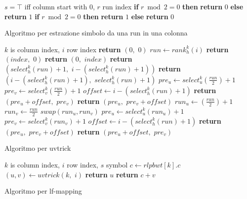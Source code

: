 \documentclass[a4paper,12pt, oneside]{book}
\begin{document}
\begin{algorithm}[H]
  \footnotesize
  \begin{algorithmic}[1]
    \Comment $s=\top$ iff column start with 0, $r$ run index
    \State \textbf{if} $r\bmod 2 = 0$ \textbf{then} \textbf{return} $0$
    \textbf{else} \textbf{return} $1$
    \Else
    \State \textbf{if} $r\bmod 2 = 0$ \textbf{then} \textbf{return} $1$
    \textbf{else} \textbf{return} $0$
    \EndIf
    \EndFunction
  \end{algorithmic}
  \caption{Algoritmo per estrazione simbolo da una run in una colonna}
\end{algorithm}

\begin{algorithm}[H]
  \footnotesize
  \begin{algorithmic}[1]
    \Comment $k$ is column index, $i$ row index
    \State \textbf{return} $(0,\,\,0)$
    \EndIf
    \State $run \gets rank_h^{k}(i)$
    \State \textbf{return} $(index,\,\, 0)$
    \Else
    \State \textbf{return} $(0, \,\,index)$
    \EndIf
    \State \textbf{return} $(select_h^{k}(run)+1,\,\, i-(select_h^{k}(run)+1))$
    \Else
    \State \textbf{return} $(i-(select_h^{k}(run)+1),\,\, select_h^{k}(run)+1)$
    \EndIf
    \Else
    \State $pre_u\gets select_u^{k}(\frac{run}{2})+1$
    \State $pre_v\gets select_v^{k}(\frac{run}{2})+1$
    \State $offset \gets i -(select_h^{k}(run)+1)$
    \State \textbf{return} $(pre_u+offset,\,\, pre_v)$
    \Else
    \State \textbf{return} $(pre_u, \,\,pre_v+offset)$
    \EndIf
    \Else
    \State $run_u\gets (\frac{run}{2})+1$
    \State $run_v\gets \frac{run}{2}$
    \State $swap(run_u, run_v)$
    \EndIf
    \State $pre_u\gets select_u^{k}(run_u)+1$
    \State $pre_v\gets select_v^{k}(run_v)+1$
    \State $offset \gets i -(select_h^{k}(run)+1)$
    \State \textbf{return} $(pre_u, \,\,pre_v+offset)$
    \Else
    \State \textbf{return} $(pre_u+offset, \,\,pre_v)$
    \EndIf
    \EndIf
    \EndIf
    \EndFunction
  \end{algorithmic}
  \caption{Algoritmo per uvtrick}
\end{algorithm}

\begin{algorithm}[H]
  \begin{algorithmic}[1]
    \Comment $k$ is column index, $i$ row index, $s$ symbol
    \State $c\gets rlpbwt[k].c$
    \State $(u, v) \gets uvtrick(k,\,\,i)$
    \State \textbf{return} $u$
    \Else
    \State \textbf{return} $c+v$
    \EndIf
    \EndFunction
  \end{algorithmic}
  \caption{Algoritmo per lf-mapping}
\end{algorithm}
\end{document}
